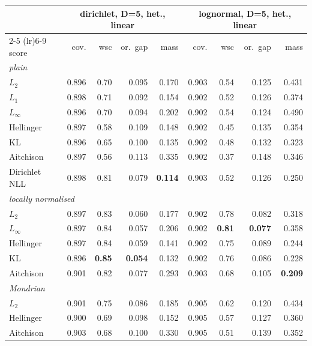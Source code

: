 \begin{tabular}{lrrrrrrrr}
\toprule
 & \multicolumn{4}{c}{dirichlet, D=5, het., linear} & \multicolumn{4}{c}{lognormal, D=5, het., linear} \\
\cmidrule(lr){2-5} \cmidrule(lr){6-9}
score & cov. & wsc & or.\ gap & mass & cov. & wsc & or.\ gap & mass \\
\midrule
\multicolumn{9}{l}{\emph{plain}} \\
$L_2$ & 0.896 & 0.70 & 0.095 & 0.170 & 0.903 & 0.54 & 0.125 & 0.431 \\
$L_1$ & 0.898 & 0.71 & 0.092 & 0.154 & 0.902 & 0.52 & 0.126 & 0.374 \\
$L_\infty$ & 0.896 & 0.70 & 0.094 & 0.202 & 0.902 & 0.54 & 0.124 & 0.490 \\
Hellinger & 0.897 & 0.58 & 0.109 & 0.148 & 0.902 & 0.45 & 0.135 & 0.354 \\
KL & 0.896 & 0.65 & 0.100 & 0.135 & 0.902 & 0.48 & 0.132 & 0.323 \\
Aitchison & 0.897 & 0.56 & 0.113 & 0.335 & 0.902 & 0.37 & 0.148 & 0.346 \\
Dirichlet NLL & 0.898 & 0.81 & 0.079 & \textbf{0.114} & 0.903 & 0.52 & 0.126 & 0.250 \\
\midrule
\multicolumn{9}{l}{\emph{locally normalised}} \\
$L_2$ & 0.897 & 0.83 & 0.060 & 0.177 & 0.902 & 0.78 & 0.082 & 0.318 \\
$L_\infty$ & 0.897 & 0.84 & 0.057 & 0.206 & 0.902 & \textbf{0.81} & \textbf{0.077} & 0.358 \\
Hellinger & 0.897 & 0.84 & 0.059 & 0.141 & 0.902 & 0.75 & 0.089 & 0.244 \\
KL & 0.896 & \textbf{0.85} & \textbf{0.054} & 0.132 & 0.902 & 0.76 & 0.086 & 0.228 \\
Aitchison & 0.901 & 0.82 & 0.077 & 0.293 & 0.903 & 0.68 & 0.105 & \textbf{0.209} \\
\midrule
\multicolumn{9}{l}{\emph{Mondrian}} \\
$L_2$ & 0.901 & 0.75 & 0.086 & 0.185 & 0.905 & 0.62 & 0.120 & 0.434 \\
Hellinger & 0.900 & 0.69 & 0.098 & 0.152 & 0.905 & 0.57 & 0.127 & 0.360 \\
Aitchison & 0.903 & 0.68 & 0.100 & 0.330 & 0.905 & 0.51 & 0.139 & 0.352 \\
\bottomrule
\end{tabular}
